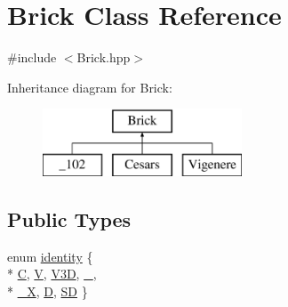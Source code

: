 \hypertarget{class_brick}{}\section{Brick Class Reference}
\label{class_brick}


{\ttfamily \#include $<$Brick.\+hpp$>$}

Inheritance diagram for Brick\+:\begin{figure}[H]
\begin{center}
\leavevmode
\includegraphics[height=2.000000cm]{d6/db9/class_brick}
\end{center}
\end{figure}
\subsection*{Public Types}
\begin{DoxyCompactItemize}
\item 
enum \hyperlink{class_brick_af32354a4d8d1275db35660a96a2cfa3e}{identity} \{ \\*
\hyperlink{class_brick_af32354a4d8d1275db35660a96a2cfa3eaf72c0102bd6b6f8f6f835ab490e1cd16}{C}, 
\hyperlink{class_brick_af32354a4d8d1275db35660a96a2cfa3ea35e09d567643db467ad9edfbb0574acc}{V}, 
\hyperlink{class_brick_af32354a4d8d1275db35660a96a2cfa3ea5a5f31986f285ab13f2cf5cd3022c5e2}{V3\+D}, 
\hyperlink{class_brick_af32354a4d8d1275db35660a96a2cfa3ea2cb1166fdee35603cf114800f3a101ef}{\+\_}, 
\\*
\hyperlink{class_brick_af32354a4d8d1275db35660a96a2cfa3ea715641459a1350fed267ec501d8c27a5}{\+\_\+X}, 
\hyperlink{class_brick_af32354a4d8d1275db35660a96a2cfa3ea33b4768f26d523132928e96355b5540f}{D}, 
\hyperlink{class_brick_af32354a4d8d1275db35660a96a2cfa3ea961676a52649c6acfe35d6df2b89bbbf}{S\+D}
 \}
\end{DoxyCompactItemize}
